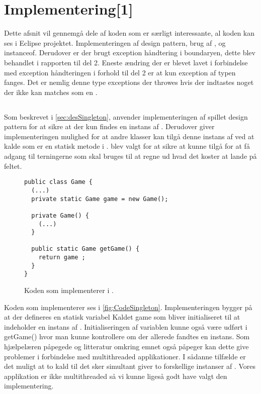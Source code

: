 \chapter{Implementering[1]}\label{chap:Implementering}
Dette afsnit vil gennemgå dele af koden som er særligt interessante, al koden kan ses i Eclipse projektet. Implementeringen af  design pattern, brug af ,  og instanceof. Derudover er der brugt exception håndtering i boundaryen, dette blev behandlet i rapporten til del 2. Eneste ændring der er blevet lavet i forbindelse med exception håndteringen i forhold til del 2 er at kun exception af typen  fanges. Det er nemlig denne type exceptions der throwes hvis der indtastes noget der ikke kan matches som en . \cite{javaExceptionInputMismatchException}

\section{}
Som beskrevet i \vref{sec:desSingleton}, anvender implementeringen af spillet  design pattern for at sikre at der kun findes en instans af . Derudover giver implementeringen mulighed for at andre klasser kan tilgå denne instans af  ved at kalde  som er en statisk metode i .  blev valgt for at sikre at  kunne tilgå  for at få adgang til terningerne som skal bruges til at regne ud hvad det koster at lande på feltet.

\begin{figure}
\caption{Koden som implementerer  i .}
\label{fig:CodeSingleton}
\centering
\begin{lstlisting}
public class Game {
  (...)
  private static Game game = new Game();

  private Game() {
    (...)
  }

  public static Game getGame() {
    return game ;
  }
}
\end{lstlisting}
\end{figure}

Koden som implementerer  ses i \vref{fig:CodeSingleton}. Implementeringen bygger på at der defineres en statisk variabel Kaldet game som bliver initialiseret til at indeholder en instans af . Initialiseringen af variablen kunne også være udført i getGame() hvor man kunne kontrollere om der allerede fandtes en instans. Som hjælpelæren påpegede og litteratur omkring emnet også påpeger kan dette give problemer i forbindelse med multithreaded applikationer. I sådanne tilfælde er det muligt at to kald til  det sker simultant giver to forskellige instanser af . Vores applikation er ikke multithreaded så vi kunne ligeså godt have valgt den implementering.

